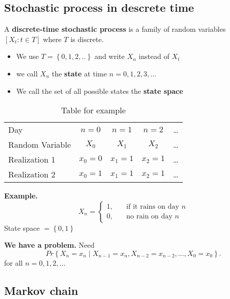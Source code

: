 \documentclass{article}
\theoremstyle{remark}
\begin{document}
\subsection{Stochastic process in descrete time}%
\label{sub:stochastic_process_in_descrete_time}
\begin{definition}
  A \textbf{discrete-time stochastic process}  is a family of random variables $\left[ X_{t} : t \in  T \right]$ where $T$ is discrete.
  \begin{itemize}
    \item We use $T = \left\{ 0,1,2,.. \right\}$ and write $X_{n}$ instead of $X_{t}$
    \item  we call $X_{n}$ the \textbf{state}  at time $n =  0,1,2,3, \ldots$
    \item We call the set of all possible states the \textbf{state space} 
  \end{itemize}
\end{definition}

\begin{table}[htpb]
  \centering
  \caption{Table for example}
  \label{tab:label}
  \begin{tabular}{l|cccc}
    Day & $n =0$ & $n=1$ & $n=2$ & \ldots \\ 
    Random Variable  & $X_{0} $ & $X_{1}$ & $X_{2}$ & \ldots \\
    Realization  1& $x_{0} = 0$ & $x_{1} =1$ &  $x_{2} = 1 $ & \ldots \\
    Realization 2 & $x_{0} = 1$ & $x_{1} =1$ &  $x_{2} = 1 $ & \ldots \\
  \end{tabular}
\end{table}
\begin{tcolorbox}
  \textbf{Example.}  \[
  X_{n} = \begin{cases}
    1 ,  &  \quad \text{if it rains on day } n \\
    0,   &  \quad     \text{no rain on day } n
  \end{cases}
  \] 
  State space $= \left\{ 0,1 \right\}$
  \par
  \textbf{We have a problem.} Need \[
  Pr \left \{ X_{n} = x_{n}  \mid  X_{n-1} = x_{n} , X_{n-2} = x_{n-2}, \ldots, X_{0} = x_{0} \right \}.
  \]    for all $n = 0,1,2,\ldots$

\end{tcolorbox}

\subsection{Markov chain}%
\label{sub:markov_chain}
\end{document}
